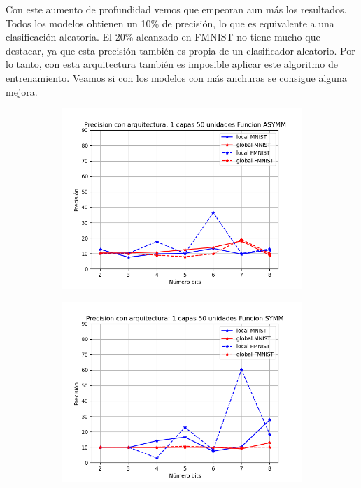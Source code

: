 Con este aumento de profundidad vemos que empeoran aun más los resultados. Todos los modelos obtienen un 10\% de precisión, lo que es equivalente a una clasificación aleatoria. El 20\% alcanzado en FMNIST no tiene mucho que destacar, ya que esta precisión también es propia de un clasificador aleatorio. Por lo tanto, con esta arquitectura también es imposible aplicar este algoritmo de entrenamiento. Veamos si con los modelos con más anchuras se consigue alguna mejora.

\begin{figure}[H]
    \centering
    \begin{subfigure}[H]{0.475\textwidth}
    \includegraphics[width=\textwidth]{imagenes/dni/Precision con arquitectura: 1 capas 50 unidades Funcion ASYMM.png}
    \end{subfigure}
    \begin{subfigure}[H]{0.475\textwidth}
    \includegraphics[width=\textwidth]{imagenes/dni/Precision con arquitectura: 1 capas 50 unidades Funcion SYMM.png}

\end{subfigure}
\end{figure}
